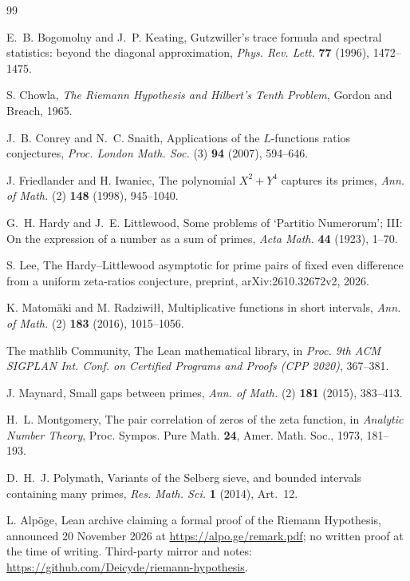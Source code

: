 \documentclass[11pt]{article}
\theoremstyle{definition}
\theoremstyle{remark}
\begin{document}
\begin{thebibliography}{99}

 E.~B. Bogomolny and J.~P. Keating, Gutzwiller's trace formula and
spectral statistics: beyond the diagonal approximation, \emph{Phys. Rev. Lett.}
\textbf{77} (1996), 1472--1475.

 S. Chowla, \emph{The Riemann Hypothesis and Hilbert's Tenth
Problem}, Gordon and Breach, 1965.

 J.~B. Conrey and N.~C. Snaith, Applications of the
$L$-functions ratios conjectures, \emph{Proc. London Math. Soc.} (3) \textbf{94}
(2007), 594--646.

 J. Friedlander and H. Iwaniec, The polynomial $X^2+Y^4$ captures
its primes, \emph{Ann. of Math.} (2) \textbf{148} (1998), 945--1040.

 G.~H. Hardy and J.~E. Littlewood, Some problems of `Partitio
Numerorum'; III: On the expression of a number as a sum of primes, \emph{Acta
Math.} \textbf{44} (1923), 1--70.

 S. Lee, The Hardy--Littlewood asymptotic for prime pairs of fixed
even difference from a uniform zeta-ratios conjecture, preprint,
arXiv:2610.32672v2, 2026.

 K. Matom\"aki and M. Radziwi\l\l, Multiplicative functions in short
intervals, \emph{Ann. of Math.} (2) \textbf{183} (2016), 1015--1056.

 The mathlib Community, The Lean mathematical library, in
\emph{Proc. 9th ACM SIGPLAN Int. Conf. on Certified Programs and Proofs
(CPP 2020)}, 367--381.

 J. Maynard, Small gaps between primes, \emph{Ann. of Math.}
(2) \textbf{181} (2015), 383--413.

 H.~L. Montgomery, The pair correlation of zeros of the zeta
function, in \emph{Analytic Number Theory}, Proc. Sympos. Pure Math. \textbf{24},
Amer. Math. Soc., 1973, 181--193.

 D.~H.~J. Polymath, Variants of the Selberg sieve, and bounded
intervals containing many primes, \emph{Res. Math. Sci.} \textbf{1} (2014),
Art.~12.

 L. Alp\"oge, Lean archive claiming a formal proof of the
Riemann Hypothesis, announced 20 November 2026 at
\url{https://alpo.ge/remark.pdf}; no written proof at the time of writing.
Third-party mirror and notes:
\url{https://github.com/Deicyde/riemann-hypothesis}.


\end{thebibliography}
\end{document}
